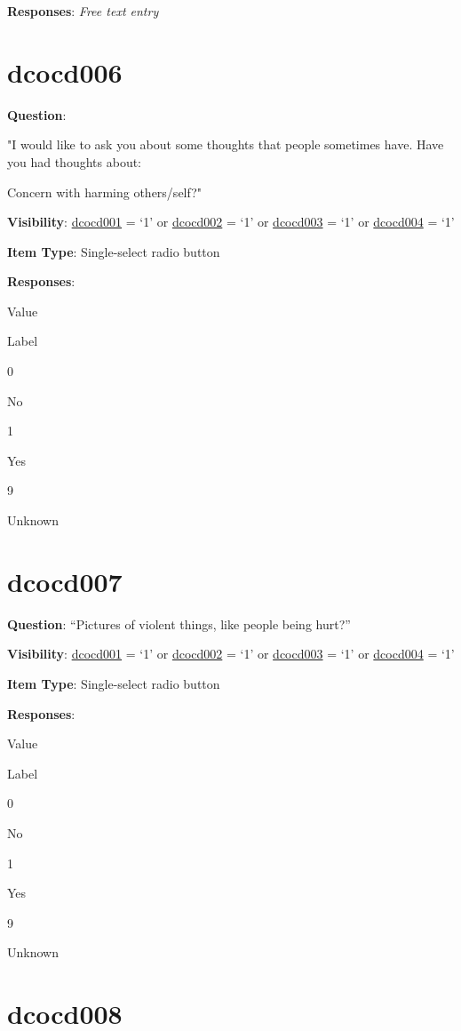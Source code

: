 \documentclass[]{book}
\begin{document}
\textbf{Responses}: \emph{Free text entry}

\hypertarget{dcocd006}{%
\section{dcocd006}\label{dcocd006}}

\textbf{Question}:

"I would like to ask you about some thoughts that people sometimes have. Have you had thoughts about:

Concern with harming others/self?"

\textbf{Visibility}: \protect\hyperlink{dcocd001}{dcocd001} = `1' or \protect\hyperlink{dcocd002}{dcocd002} = `1' or \protect\hyperlink{dcocd003}{dcocd003} = `1' or \protect\hyperlink{dcocd004}{dcocd004} = `1'

\textbf{Item Type}: Single-select radio button

\textbf{Responses}:

Value

Label

0

No

1

Yes

9

Unknown

\hypertarget{dcocd007}{%
\section{dcocd007}\label{dcocd007}}

\textbf{Question}: ``Pictures of violent things, like people being hurt?''

\textbf{Visibility}: \protect\hyperlink{dcocd001}{dcocd001} = `1' or \protect\hyperlink{dcocd002}{dcocd002} = `1' or \protect\hyperlink{dcocd003}{dcocd003} = `1' or \protect\hyperlink{dcocd004}{dcocd004} = `1'

\textbf{Item Type}: Single-select radio button

\textbf{Responses}:

Value

Label

0

No

1

Yes

9

Unknown

\hypertarget{dcocd008}{%
\section{dcocd008}\label{dcocd008}}
\end{document}
